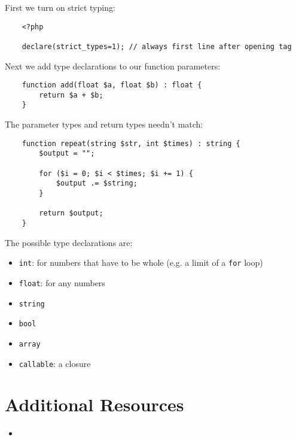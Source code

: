 First we turn on strict typing:

\begin{verbatim}
    <?php

    declare(strict_types=1); // always first line after opening tag
\end{verbatim}

Next we add type declarations to our function parameters:

\begin{verbatim}
    function add(float $a, float $b) : float {
        return $a + $b;
    }
\end{verbatim}

The parameter types and return types needn't match:

\begin{verbatim}
    function repeat(string $str, int $times) : string {
        $output = "";

        for ($i = 0; $i < $times; $i += 1) {
            $output .= $string;
        }

        return $output;
    }
\end{verbatim}

The possible type declarations are:



\begin{itemize}
    \item \texttt{int}: for numbers that have to be whole (e.g. a limit of a \texttt{for} loop)
    \item \texttt{float}: for any numbers
    \item \texttt{string}
    \item \texttt{bool}
    \item \texttt{array}
    \item \texttt{callable}: a closure
\end{itemize}


\section{Additional Resources}

\begin{itemize}[leftmargin=*]
    \item %
\end{itemize}
